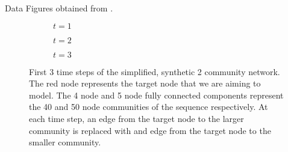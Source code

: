 \documentclass[12pt]{amsart}
\begin{document}
\begin{section}{Data}
        Figures obtained from \cite{Emma2023}.
        \begin{figure}[H]
            \centering
            \centering
            \begin{subfigure}[c]{0.3\textwidth}
                \centering
                \resizebox{.6\width}{!}{}
                \caption{$t=1$}
                \label{2community train series, a}
            \end{subfigure}
            \hfill
            \centering
            \begin{subfigure}[c]{0.3\textwidth}
                \centering
                \resizebox{.6\width}{!}{}
                \caption{$t=2$}
                \label{2community train series, b}
            \end{subfigure}
            \hfill
            \centering
            \begin{subfigure}[c]{0.3\textwidth}
                \centering
                \resizebox{.6\width}{!}{}
                \caption{$t=3$}
                \label{2community train series, c}
            \end{subfigure}
            \caption{First 3 time steps of the simplified, synthetic 2 community network. The red node represents the target node that we are aiming to model. The 4 node and 5 node fully connected components represent the 40 and 50 node communities of the sequence respectively. At each time step, an edge from the target node to the larger community is replaced with and edge from the target node to the smaller community.}
            \label{2community train series}
        \end{figure}


\end{section}
\end{document}
